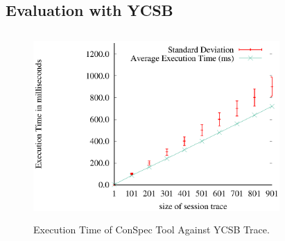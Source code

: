 \documentclass[journal,compsoc]{IEEEtran}
\begin{document}
  \subsection{Evaluation with YCSB}\label{sec:evalycsb}
      \begin{figure}%
        \includegraphics[width=3.7in,height=2.8in]
                    {conspecYCSBvarhist.eps} %
        \caption{Execution Time of ConSpec Tool Against YCSB Trace.}
        \label{fig:examplefull}
\end{figure}
\end{document}
